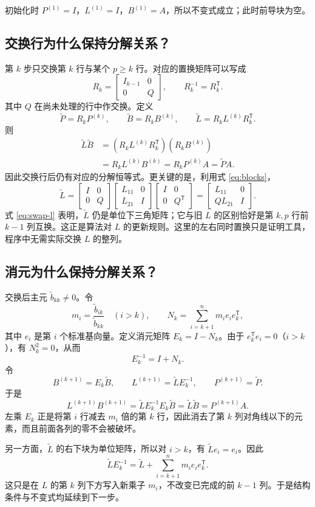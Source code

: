 \documentclass[UTF8,11pt,a4paper,fontset=fandol]{ctexart}
\newcommand{\mat}[1]{\begin{bmatrix}#1\end{bmatrix}}
\begin{document}
初始化时 $P^{(1)}=I$，$L^{(1)}=I$，$B^{(1)}=A$，所以不变式成立；此时前导块为空。

\subsection{交换行为什么保持分解关系？}
第 $k$ 步只交换第 $k$ 行与某个 $p\ge k$ 行。对应的置换矩阵可以写成
\[
R_k=\mat{I_{k-1}&0\\0&Q},\qquad R_k^{-1}=R_k^{\mathsf T}.
\]
其中 $Q$ 在尚未处理的行中作交换。定义
\[
\widetilde P=R_kP^{(k)},\qquad
\widetilde B=R_kB^{(k)},\qquad
\widetilde L=R_kL^{(k)}R_k^{\mathsf T}.
\]
则
\begin{align*}
\widetilde L\widetilde B
&=(R_kL^{(k)}R_k^{\mathsf T})(R_kB^{(k)})\\
&=R_kL^{(k)}B^{(k)}=R_kP^{(k)}A=\widetilde P A.
\end{align*}
因此交换行后仍有对应的分解恒等式。更关键的是，利用式 \eqref{eq:blocks}，
\begin{equation}
\widetilde L
=\mat{I&0\\0&Q}\mat{L_{11}&0\\L_{21}&I}\mat{I&0\\0&Q^{\mathsf T}}
=\mat{L_{11}&0\\QL_{21}&I}.
\label{eq:swap-l}
\end{equation}
式 \eqref{eq:swap-l} 表明，$\widetilde L$ 仍是单位下三角矩阵；它与旧 $L$ 的区别恰好是第 $k,p$ 行前 $k-1$ 列互换。这正是算法对 $L$ 的更新规则。这里的左右同时置换只是证明工具，程序中无需实际交换 $L$ 的整列。

\subsection{消元为什么保持分解关系？}
交换后主元 $\widetilde b_{kk}\ne0$。令
\[
m_i=\frac{\widetilde b_{ik}}{\widetilde b_{kk}}\quad(i>k),
\qquad
N_k=\sum_{i=k+1}^{n}m_i e_i e_k^{\mathsf T},
\]
其中 $e_i$ 是第 $i$ 个标准基向量。定义消元矩阵 $E_k=I-N_k$。由于 $e_k^{\mathsf T}e_i=0$（$i>k$），有 $N_k^2=0$，从而
\[
E_k^{-1}=I+N_k.
\]
令
\[
B^{(k+1)}=E_k\widetilde B,\qquad
L^{(k+1)}=\widetilde L E_k^{-1},\qquad
P^{(k+1)}=\widetilde P.
\]
于是
\[
L^{(k+1)}B^{(k+1)}
=\widetilde L E_k^{-1}E_k\widetilde B
=\widetilde L\widetilde B=P^{(k+1)}A.
\]
左乘 $E_k$ 正是将第 $i$ 行减去 $m_i$ 倍的第 $k$ 行，因此消去了第 $k$ 列对角线以下的元素，而且前面各列的零不会被破坏。

另一方面，$\widetilde L$ 的右下块为单位矩阵，所以对 $i>k$，有 $\widetilde L e_i=e_i$。因此
\[
\widetilde L E_k^{-1}
=\widetilde L+\sum_{i=k+1}^{n}m_i e_i e_k^{\mathsf T}.
\]
这只是在 $L$ 的第 $k$ 列下方写入新乘子 $m_i$，不改变已完成的前 $k-1$ 列。于是结构条件与不变式均延续到下一步。
\end{document}
